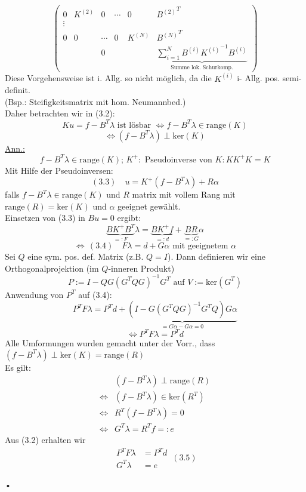 \begin{enumerate}
\[\begin{pmatrix}
				0 & K^{(2)}   & 0 & \cdots  &0 & {B^{(2)}}^T\\
				\vdots\\
				 0 & 0 & \cdots & 0 & K^{(N)} & {B^{(N)}}^T \\
			           &     &      0    &   &            &  \underbrace{\sum_{i=1}^N B^{(i)}{K^{(i)}}^{-1} B^{(i)}}_{\text{Summe lok. Schurkomp.}}
				\end{pmatrix}
\]
Diese Vorgehensweise ist i. Allg. so nicht möglich, da die $K^{(i)}$ i- Allg. pos. semi-definit.\\
(Bsp.: Steifigkeitsmatrix mit hom. Neumannbed.)\\
Daher betrachten wir in (3.2):
\[ Ku=f-B^T\lambda \text{ ist lösbar } \Leftrightarrow f-B^T\lambda \in \text{range}(K) \]
\[ \Leftrightarrow (f-B^T\lambda) \perp \text{ker}(K) \]
\underline{Ann.:}
\[ f-B^T\lambda \in \text{range}(K);\, K^+ : \text{ Pseudoinverse von } K: KK^+K=K \]
Mit Hilfe der Pseudoinversen:
\[(3.3)\quad  u=K^+(f-B^T\lambda)+R\alpha  \]
falls $f-B^T\lambda \in \text{range}(K)$ und $R$ matrix mit vollem Rang mit $\text{range}(R)= \text{ker}(K)$ und $\alpha$ geeignet gewählt.\\
Einsetzen von (3.3) in $Bu=0$ ergibt:
\[ \underbrace{BK^+ B^T}_{=:F} \lambda = \underbrace{BK^+ f}_{=:d} + \underbrace{BR}_{=:G}\alpha \]
\[ \Leftrightarrow \, (3.4) \quad \boxed{ F\lambda= d + G\alpha } \text{ mit geeignetem } \alpha \]
Sei $Q$ eine sym. pos. def. Matrix (z.B. $Q=I$). Dann definieren wir eine Orthogonalprojektion (im $Q$-inneren Produkt)
\[ P:=I-QG(G^TQG)^{-1}G^T \text{ auf } V:= \text{ker}(G^T) \]
Anwendung von $P^T$  auf (3.4):
\[ P^TF\lambda = P^Td + \underbrace{(I-G(G^TQG)^{-1}G^TQ)G\alpha}_{=G\alpha - G\alpha=0} \]
\[ \Leftrightarrow \boxed{P^TF\lambda = P^T d } \]
Alle Umformungen wurden gemacht unter der Vorr., dass $ (f-B^T\lambda)\perp \text{ker}(K)=\text{range}(R)$ \\
Es gilt:
\begin{align*}
 & (f-B^T\lambda)\perp \text{range}(R) \\
\Leftrightarrow & (f-B^T\lambda) \in \text{ker} (R^T) \\
\Leftrightarrow & R^T(f-B^T\lambda)=0 \\
\Leftrightarrow & G^T\lambda = R^Tf =:e
\end{align*}
Aus (3.2) erhalten wir
\[ \boxed{ \begin{aligned} P^TF\lambda &= P^Td \\ G^T\lambda &= e  \end{aligned}} \, (3.5) \]







\end{enumerate}• 
